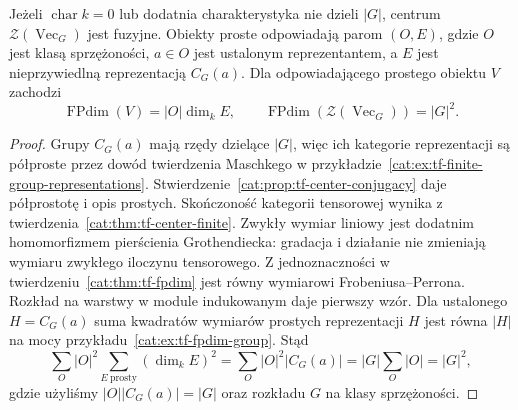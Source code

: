 \begin{wniosek}\label{cat:cor:tf-center-group-dimension}
Jeżeli $\operatorname{char}k=0$ lub dodatnia charakterystyka nie dzieli $|G|$, centrum $\mathcal Z(\operatorname{Vec}_G)$ jest fuzyjne. Obiekty proste odpowiadają parom $(O,E)$, gdzie $O$ jest klasą sprzężoności, $a\in O$ jest ustalonym reprezentantem, a $E$ jest nieprzywiedlną reprezentacją $C_G(a)$. Dla odpowiadającego prostego obiektu $V$ zachodzi
\[
 \operatorname{FPdim}(V)=|O|\dim_k E,\qquad
 \operatorname{FPdim}(\mathcal Z(\operatorname{Vec}_G))=|G|^2.
\]
\end{wniosek}
\begin{proof}
Grupy $C_G(a)$ mają rzędy dzielące $|G|$, więc ich kategorie reprezentacji są półproste przez dowód twierdzenia Maschkego w przykładzie~\ref{cat:ex:tf-finite-group-representations}. Stwierdzenie~\ref{cat:prop:tf-center-conjugacy} daje półprostotę i opis prostych. Skończoność kategorii tensorowej wynika z twierdzenia~\ref{cat:thm:tf-center-finite}. Zwykły wymiar liniowy jest dodatnim homomorfizmem pierścienia Grothendiecka: gradacja i działanie nie zmieniają wymiaru zwykłego iloczynu tensorowego. Z jednoznaczności w twierdzeniu~\ref{cat:thm:tf-fpdim} jest równy wymiarowi Frobeniusa--Perrona. Rozkład na warstwy w module indukowanym daje pierwszy wzór. Dla ustalonego $H=C_G(a)$ suma kwadratów wymiarów prostych reprezentacji $H$ jest równa $|H|$ na mocy przykładu~\ref{cat:ex:tf-fpdim-group}. Stąd
\[
 \sum_O |O|^2\sum_{E\ \mathrm{prosty}}(\dim_kE)^2
 =\sum_O |O|^2|C_G(a)|
 =|G|\sum_O|O|=|G|^2,
\]
gdzie użyliśmy $|O||C_G(a)|=|G|$ oraz rozkładu $G$ na klasy sprzężoności.
\end{proof}

